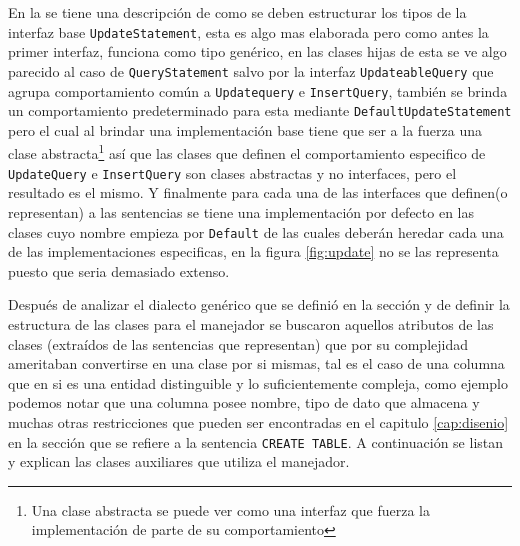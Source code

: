 En la  se tiene una descripción de como se deben estructurar los tipos de la interfaz base \verb=UpdateStatement=, esta es algo mas elaborada pero como antes la primer interfaz, funciona como tipo genérico, en las clases hijas de esta se ve algo parecido al caso de \verb=QueryStatement= salvo por la interfaz \verb=UpdateableQuery= que agrupa comportamiento común a \verb=Updatequery= e \verb=InsertQuery=, también se brinda un comportamiento predeterminado para esta mediante \verb=DefaultUpdateStatement= pero el cual al brindar una implementación base tiene que ser a la fuerza una clase abstracta\footnote{Una clase abstracta se puede ver como una interfaz que fuerza la implementación de parte de su comportamiento} así que las clases que definen el comportamiento especifico de \verb=UpdateQuery= e \verb=InsertQuery= son clases abstractas y no interfaces, pero el resultado es el mismo. Y finalmente para cada una de las interfaces que definen(o representan) a las sentencias se tiene una implementación por defecto en las clases cuyo nombre empieza por \verb=Default= de las cuales deberán heredar cada una de las implementaciones especificas, en la figura \ref{fig:update} no se las representa puesto que seria demasiado extenso.

Después de analizar el dialecto genérico que se definió en la sección  y de definir la estructura de las clases para el manejador se buscaron aquellos atributos de las clases (extraídos de las sentencias que representan) que por su complejidad ameritaban convertirse en una clase por si mismas, tal es el caso de una columna que en si es una entidad distinguible y lo suficientemente compleja, como ejemplo podemos notar que una columna posee nombre, tipo de dato que almacena y muchas otras restricciones que pueden ser encontradas en el capitulo \ref{cap:disenio} en la sección que se refiere a la sentencia \verb=CREATE TABLE=. A continuación se listan y explican las clases auxiliares que utiliza el manejador. 
%
